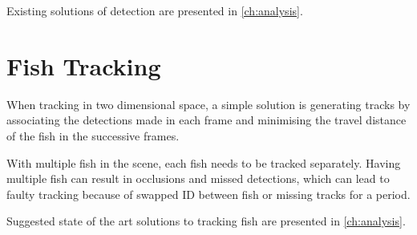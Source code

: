 Existing solutions of detection are presented in \autoref{ch:analysis}.

\section{Fish Tracking}
When tracking in two dimensional space, a simple solution is generating tracks by associating the detections made in each frame and minimising the travel distance of the fish in the successive frames.

With multiple fish in the scene, each fish needs to be tracked separately. Having multiple fish can result in occlusions and missed detections, which can lead to faulty tracking because of swapped ID between fish or missing tracks for a period.

Suggested state of the art solutions to tracking fish are presented in \autoref{ch:analysis}.
